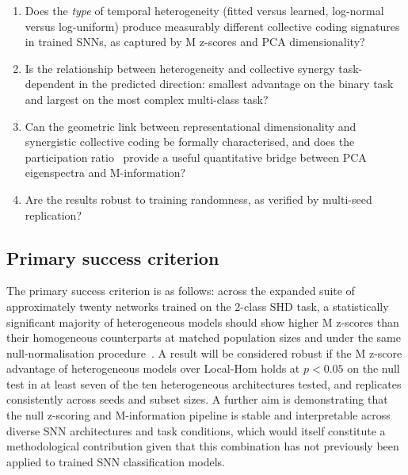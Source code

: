 \documentclass[12pt,twoside]{report}
\begin{document}
\begin{enumerate}

    \item Does the \emph{type} of temporal heterogeneity (fitted
    versus learned, log-normal versus log-uniform) produce measurably 
    different collective coding signatures in trained SNNs, as captured 
    by M z-scores and PCA dimensionality?

    \item Is the relationship between heterogeneity and collective synergy 
    task-dependent in the predicted direction: smallest advantage on the 
    binary task and largest on the most complex multi-class task?

    \item Can the geometric link between representational dimensionality 
    and synergistic collective coding be formally characterised, and does 
    the participation ratio~\cite{wakhloo2026} provide a useful quantitative 
    bridge between PCA eigenspectra and M-information?

    \item Are the results robust to training randomness, as verified 
    by multi-seed replication?

\end{enumerate}

\subsection*{Primary success criterion}

The primary success criterion is as follows: across the expanded suite of
approximately twenty networks trained on the 2-class SHD task, a statistically
significant majority of heterogeneous models should show higher M z-scores than their
homogeneous counterparts at matched population sizes and under the same
null-normalisation procedure~\cite{liarinull}. A result will be considered robust if
the M z-score advantage of heterogeneous models over Local-Hom holds at $p < 0.05$ on
the null test in at least seven of the ten heterogeneous architectures tested, and
replicates consistently across seeds and subset sizes. A further aim is demonstrating
that the null z-scoring and M-information pipeline is stable and interpretable across
diverse SNN architectures and task conditions, which would itself constitute a
methodological contribution given that this combination has not previously been applied
to trained SNN classification models.




\end{document}
